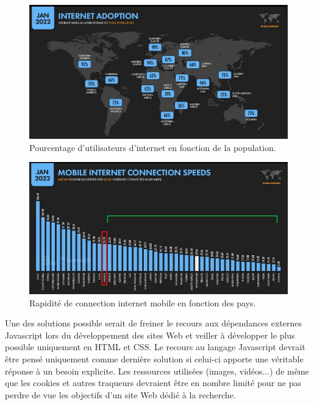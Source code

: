 \documentclass[a4paper,12pt,twoside]{book}
\begin{document}
\begin{figure}[H]
    \centering
    \includegraphics[width=13cm]{img/partie_3/internet.JPG}
    \caption[Pourcentage d'utilisateurs d'internet en fonction de la population]{Pourcentage d'utilisateurs d'internet en fonction de la population.\footnotemark}
    \label{internet}
\end{figure}


\begin{figure}[H]
    \centering
    \includegraphics[width=13cm]{img/partie_3/mobile.JPG}
    \caption[Rapidité de connection internet mobile en fonction des pays]{Rapidité de connection internet mobile en fonction des pays.\footnotemark}
    \label{mobile}
\end{figure}


Une des solutions possible serait de freiner le recours aux dépendances externes Javascript lors du développement des sites Web et veiller à développer le plus possible uniquement en \acrshort{HTML} et CSS. Le recours au langage Javascript devrait être pensé uniquement comme dernière solution si celui-ci apporte une véritable réponse à un besoin explicite. Les ressources utilisées (images, vidéos...) de même que les cookies et autres traqueurs devraient être en nombre limité pour ne pas perdre de vue les objectifs d'un site Web dédié à la recherche.
\end{document}
